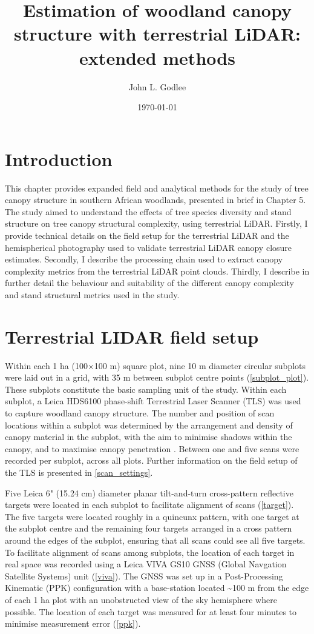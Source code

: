 \documentclass[11pt,a4paper]{article}
\title{Estimation of woodland canopy structure with terrestrial LiDAR: extended methods}
\author{John L. Godlee}
\date{\today}
\begin{document}
\maketitle{}

\linenumbers

\section{Introduction}

This chapter provides expanded field and analytical methods for the study of tree canopy structure in southern African woodlands, presented in brief in Chapter 5. The study aimed to understand the effects of tree species diversity and stand structure on tree canopy structural complexity, using terrestrial LiDAR. Firstly, I provide technical details on the field setup for the terrestrial LiDAR and the hemispherical photography used to validate terrestrial LiDAR canopy closure estimates. Secondly, I describe the processing chain used to extract canopy complexity metrics from the terrestrial LiDAR point clouds. Thirdly, I describe in further detail the behaviour and suitability of the different canopy complexity and stand structural metrics used in the study.

\section{Terrestrial LIDAR field setup}

Within each 1 ha (100$\times$100 m) square plot, nine 10 m diameter circular subplots were laid out in a grid, with 35 m between subplot centre points (\autoref{subplot_plot}). These subplots constitute the basic sampling unit of the study. Within each subplot, a Leica HDS6100 phase-shift Terrestrial Laser Scanner (TLS) was used to capture woodland canopy structure. The number and position of scan locations within a subplot was determined by the arrangement and density of canopy material in the subplot, with the aim to minimise shadows within the canopy, and to maximise canopy penetration \citep{Beland2021b}. Between one and five scans were recorded per subplot, across all plots. Further information on the field setup of the TLS is presented in \autoref{scan_settings}.

Five Leica 6" (15.24 cm) diameter planar tilt-and-turn cross-pattern reflective targets were located in each subplot to facilitate alignment of scans (\autoref{target}). The five targets were located roughly in a quincunx pattern, with one target at the subplot centre and the remaining four targets arranged in a cross pattern around the edges of the subplot, ensuring that all scans could see all five targets. To facilitate alignment of scans among subplots, the location of each target in real space was recorded using a Leica VIVA GS10 GNSS (Global Navgation Satellite Systems) unit (\autoref{viva}). The GNSS was set up in a Post-Processing Kinematic (PPK) configuration with a base-station located \textasciitilde{}100 m from the edge of each 1 ha plot with an unobstructed view of the sky hemisphere where possible. The location of each target was measured for at least four minutes to minimise measurement error (\autoref{ppk}). 
\end{document}
